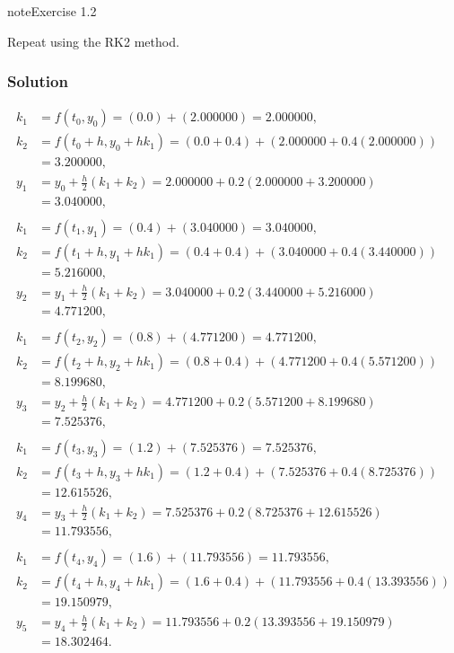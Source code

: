 \documentclass[letterpaper,10pt,english]{jupyterBook}
\begin{document}
\begin{sphinxadmonition}{note}{Exercise 1.2}

\sphinxAtStartPar
Repeat {\hyperref[\detokenize{1_IVPs/1.7_Exercises:ex1-1}]{}} using the RK2 method.
\subsubsection*{Solution}
\begin{align*}
    k_1 &= f(t_0, y_0) = (0.0) + (2.000000) = 2.000000, \\
    k_2 &= f(t_0 + h, y_0 + hk_1) = (0.0 + 0.4) + (2.000000 + 0.4(2.000000)) \\
    &= 3.200000, \\
    y_1 &= y_0 + \frac{h}{2}(k_1 + k_2) = 2.000000 + 0.2(2.000000 + 3.200000) \\
    &= 3.040000, \\ \\
    k_1 &= f(t_1, y_1) = (0.4) + (3.040000) = 3.040000, \\
    k_2 &= f(t_1 + h, y_1 + hk_1) = (0.4 + 0.4) + (3.040000 + 0.4(3.440000)) \\
    &= 5.216000, \\
    y_2 &= y_1 + \frac{h}{2}(k_1 + k_2) = 3.040000 + 0.2(3.440000 + 5.216000) \\
    &= 4.771200, \\ \\
    k_1 &= f(t_2, y_2) = (0.8) + (4.771200) = 4.771200, \\
    k_2 &= f(t_2 + h, y_2 + hk_1) = (0.8 + 0.4) + (4.771200 + 0.4(5.571200)) \\
    &= 8.199680, \\
    y_3 &= y_2 + \frac{h}{2}(k_1 + k_2) = 4.771200 + 0.2(5.571200 + 8.199680) \\
    &= 7.525376, \\ \\
    k_1 &= f(t_3, y_3) = (1.2) + (7.525376) = 7.525376, \\
    k_2 &= f(t_3 + h, y_3 + hk_1) = (1.2 + 0.4) + (7.525376 + 0.4(8.725376)) \\
    &= 12.615526, \\
    y_4 &= y_3 + \frac{h}{2}(k_1 + k_2) = 7.525376 + 0.2(8.725376 + 12.615526) \\
    &= 11.793556, \\ \\
    k_1 &= f(t_4, y_4) = (1.6) + (11.793556) = 11.793556, \\
    k_2 &= f(t_4 + h, y_4 + hk_1) = (1.6 + 0.4) + (11.793556 + 0.4(13.393556)) \\
    &= 19.150979, \\
    y_5 &= y_4 + \frac{h}{2}(k_1 + k_2) = 11.793556 + 0.2(13.393556 + 19.150979) \\
    &= 18.302464.
\end{align*}\end{sphinxadmonition}
\end{document}
